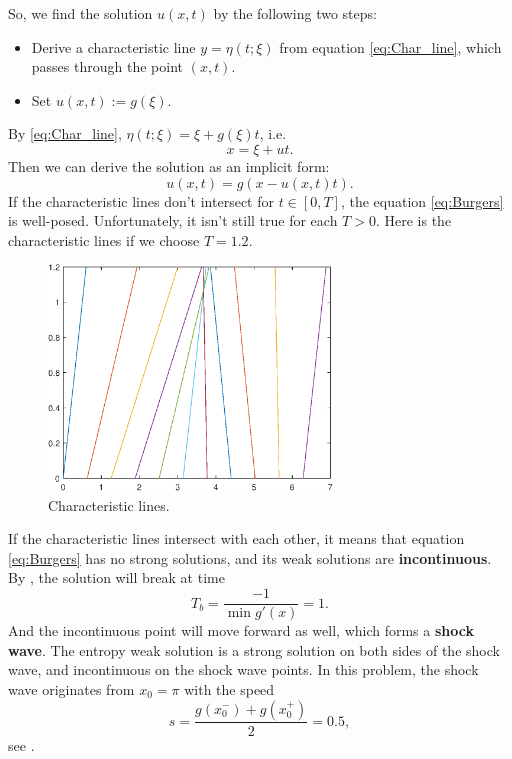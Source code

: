 \documentclass[a4paper]{article}
\begin{document}
So, we find the solution $u(x,t)$ by the following two steps:
\begin{itemize}
    \item Derive a characteristic line $y=\eta(t;\xi)$ from equation \eqref{eq:Char_line}, 
    which passes through the point $(x,t)$.
    \item Set $u(x,t):=g(\xi)$.
\end{itemize}
By \eqref{eq:Char_line}, $\eta(t;\xi)=\xi+g(\xi)t$, i.e. 
\begin{displaymath}
    x=\xi+ut.
\end{displaymath}
Then we can derive the solution as an implicit form:
\begin{equation}
    \label{eq:sol_of_Burgers}
    u(x,t)=g(x-u(x,t)t).
\end{equation}
If the characteristic lines don't intersect for $t\in[0,T]$, 
the equation \eqref{eq:Burgers} is well-posed. 
Unfortunately, it isn't still true for each $T>0$. Here is the characteristic lines 
if we choose $T=1.2$.
\begin{figure}[H]
    \centering
    \includegraphics[width=\linewidth,height=6cm]{figure/Charline.eps}
    \caption{Characteristic lines.}
\end{figure}
If the characteristic lines intersect with each other, it means that 
equation \eqref{eq:Burgers} has no strong solutions, and its weak solutions are 
\textbf{incontinuous}. By \cite[Exercise 3.3]{1}, the solution will break at time 
\begin{equation}
    T_{b}=\frac{-1}{\min g'(x)}=1.
\end{equation}
And the incontinuous point will move forward as well, which forms a \textbf{shock wave}. 
The entropy weak solution is a strong solution on both sides of the shock wave, 
and incontinuous on the shock wave points. 
In this problem, the shock wave originates from $x_{0}=\pi$ with the speed 
\begin{equation}
    s=\frac{g(x_{0}^-)+g(x_{0}^{+})}{2}=0.5,
\end{equation}
see \cite[(3.26)]{1}.
\end{document}
